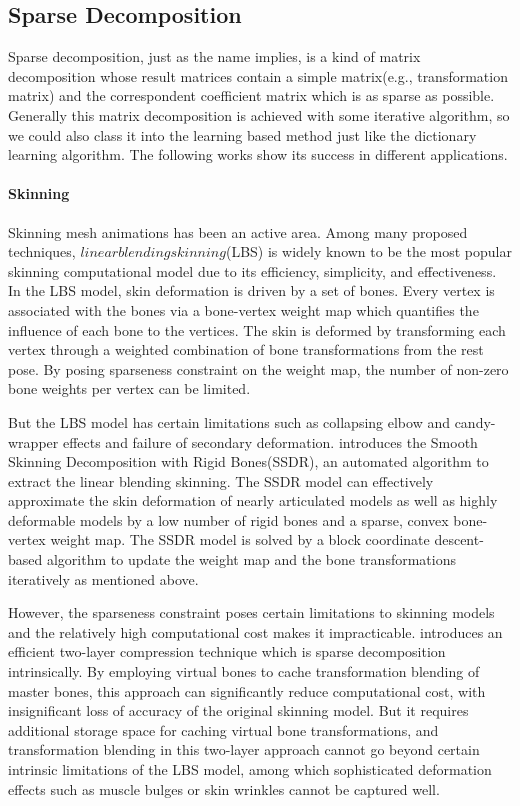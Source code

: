 \label{sec:Learning}

\subsection{Sparse Decomposition}

Sparse decomposition, just as the name implies, is a kind of matrix decomposition whose result matrices contain a simple matrix(e.g., transformation matrix\cite{le2012smooth}) and the correspondent coefficient matrix which is as sparse as possible. Generally this matrix decomposition is achieved with some iterative algorithm, so we could also class it into the learning based method just like the dictionary learning algorithm. The following works show its success in different applications.

\paragraph{Skinning}

Skinning mesh animations has been an active area. Among many proposed techniques, $linear blending skinning$(LBS) is widely known to be the most popular skinning computational model due to its efficiency, simplicity, and effectiveness. In the LBS model, skin deformation is driven by a set of bones. Every vertex is associated with the bones via a bone-vertex weight map which quantifies the influence of each bone to the vertices. The skin is deformed by transforming each vertex through a weighted combination of bone transformations from the rest pose. By posing sparseness constraint on the weight map, the number of non-zero bone weights per vertex can be limited.

But the LBS model has certain limitations such as collapsing elbow and candy-wrapper effects and failure of secondary deformation. \cite{le2012smooth} introduces the Smooth Skinning Decomposition with Rigid Bones(SSDR), an automated algorithm to extract the linear blending skinning. The SSDR model can effectively approximate the skin deformation of nearly articulated models as well as highly deformable models by a low number of rigid bones and a sparse, convex bone-vertex weight map. The SSDR model is solved by a block coordinate descent-based algorithm to update the weight map and the bone transformations iteratively as mentioned above.

However, the sparseness constraint poses certain limitations to skinning models and the relatively high computational cost makes it impracticable. \cite{le2013two} introduces an efficient two-layer compression technique which is sparse decomposition intrinsically. By employing virtual bones to cache transformation blending of master bones, this approach can significantly reduce computational cost, with insignificant loss of accuracy of the original skinning model. But it requires additional storage space for caching virtual bone transformations, and transformation blending in this two-layer approach cannot go beyond certain intrinsic limitations of the LBS model, among which sophisticated deformation effects such as muscle bulges or skin wrinkles cannot be captured well.

